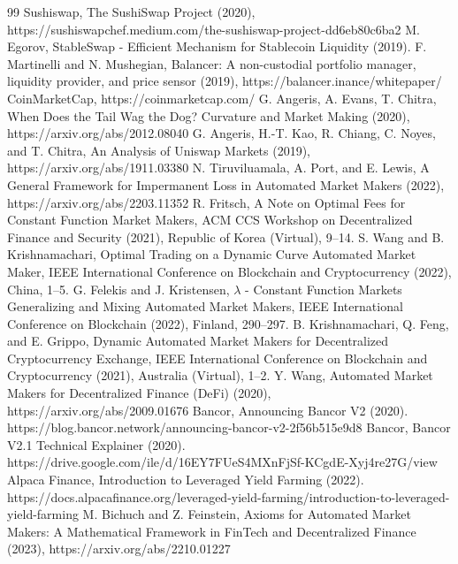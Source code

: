 \documentclass[12pt,a4paper]{article}
\begin{document}
\begin{thebibliography}{99}
Sushiswap, The SushiSwap Project (2020), https://sushiswapchef.medium.com/the-sushiswap-project-dd6eb80c6ba2
M. Egorov, StableSwap - Efficient Mechanism for Stablecoin Liquidity (2019).
F. Martinelli and N. Mushegian, Balancer: A non-custodial portfolio manager, liquidity provider, and price sensor (2019), https://balancer.inance/whitepaper/
CoinMarketCap, https://coinmarketcap.com/
G. Angeris, A. Evans, T. Chitra, When Does the Tail Wag the Dog? Curvature and Market Making (2020), https://arxiv.org/abs/2012.08040
G. Angeris, H.-T. Kao, R. Chiang, C. Noyes, and T. Chitra, An Analysis of Uniswap Markets (2019), https://arxiv.org/abs/1911.03380
N. Tiruviluamala, A. Port, and E. Lewis, A General Framework for Impermanent Loss in Automated Market Makers (2022), https://arxiv.org/abs/2203.11352
R. Fritsch, A Note on Optimal Fees for Constant Function Market Makers, ACM CCS Workshop on Decentralized Finance and Security (2021), Republic of Korea (Virtual), 9--14.
S. Wang and B. Krishnamachari, Optimal Trading on a Dynamic Curve Automated Market Maker, IEEE International Conference on Blockchain and Cryptocurrency (2022), China, 1--5.
G. Felekis and J. Kristensen, $\lambda$ - Constant Function Markets Generalizing and Mixing Automated Market Makers, IEEE International Conference on Blockchain (2022), Finland, 290--297.
B. Krishnamachari, Q. Feng, and E. Grippo, Dynamic Automated Market Makers for Decentralized Cryptocurrency Exchange, IEEE International Conference on Blockchain and Cryptocurrency (2021), Australia (Virtual), 1--2.
Y. Wang, Automated Market Makers for Decentralized Finance (DeFi) (2020), https://arxiv.org/abs/2009.01676
Bancor, Announcing Bancor V2 (2020). https://blog.bancor.network/announcing-bancor-v2-2f56b515e9d8
Bancor, Bancor V2.1 Technical Explainer (2020). https://drive.google.com/ile/d/16EY7FUeS4MXnFjSf-KCgdE-Xyj4re27G/view
Alpaca Finance, Introduction to Leveraged Yield Farming (2022). https://docs.alpacafinance.org/leveraged-yield-farming/introduction-to-leveraged-yield-farming
M. Bichuch and Z. Feinstein, Axioms for Automated Market Makers: A Mathematical Framework in FinTech and Decentralized Finance (2023), https://arxiv.org/abs/2210.01227
\end{thebibliography}
\end{document}
